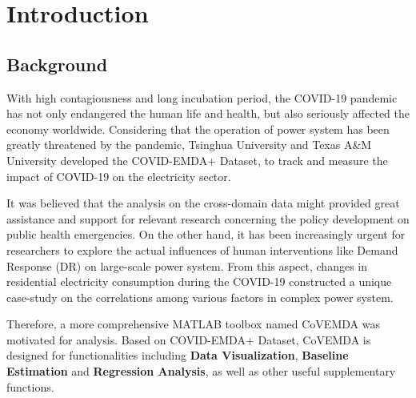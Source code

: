 \documentclass[10pt]{article}
\numberwithin{equation}{section}
\numberwithin{table}{section}
\numberwithin{figure}{section}
\begin{document}
\newpage
\section{Introduction} \label{sec:intro}

\subsection{Background}

With high contagiousness and long incubation period\cite{who2021}, the COVID-19 pandemic has not only endangered the human life and health, but also seriously affected the economy worldwide. Considering that the operation of power system has been greatly threatened by the pandemic, Tsinghua University and Texas A\&M University developed the COVID-EMDA+ Dataset, to track and measure the impact of COVID-19 on the electricity sector.


It was believed that the analysis on the cross-domain data might provided great assistance and support for relevant research concerning the policy development on public health emergencies. On the other hand, it has been increasingly urgent for researchers to explore the actual influences of human interventions like Demand Response (DR) on large-scale power system. From this aspect, changes in residential electricity consumption during the COVID-19 constructed a unique case-study on the correlations among various factors in complex power system.

Therefore, a more comprehensive MATLAB toolbox named CoVEMDA was motivated for analysis. Based on COVID-EMDA+ Dataset, CoVEMDA is designed for functionalities including \textbf{Data Visualization}, \textbf{Baseline Estimation} and \textbf{Regression Analysis}, as well as other useful supplementary functions.
\end{document}
